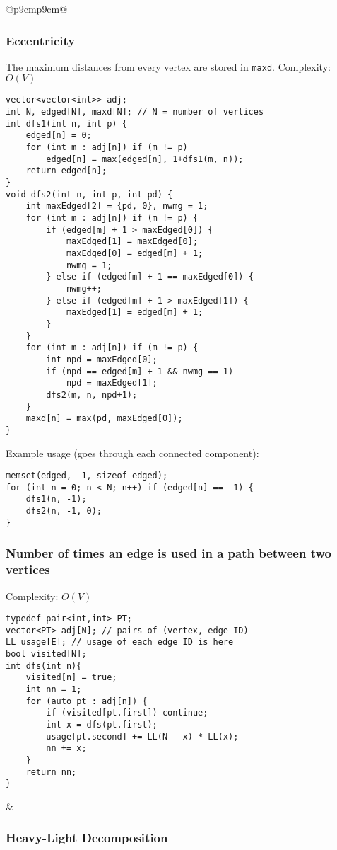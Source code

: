 \documentclass[letterpaper]{article}
\begin{document}
\clearpage
\begin{tabular}{@{}p{9cm}p{9cm}@{}}

\subsubsection{Eccentricity}

The maximum distances from every vertex are stored in \texttt{maxd}. Complexity: $O\left(V\right)$

\begin{lstlisting}
vector<vector<int>> adj;
int N, edged[N], maxd[N]; // N = number of vertices
int dfs1(int n, int p) {
	edged[n] = 0;
	for (int m : adj[n]) if (m != p)
		edged[n] = max(edged[n], 1+dfs1(m, n));
	return edged[n];
}
void dfs2(int n, int p, int pd) {
	int maxEdged[2] = {pd, 0}, nwmg = 1;
	for (int m : adj[n]) if (m != p) {
		if (edged[m] + 1 > maxEdged[0]) {
			maxEdged[1] = maxEdged[0];
			maxEdged[0] = edged[m] + 1;
			nwmg = 1;
		} else if (edged[m] + 1 == maxEdged[0]) {
			nwmg++;
		} else if (edged[m] + 1 > maxEdged[1]) {
			maxEdged[1] = edged[m] + 1;
		}
	}
	for (int m : adj[n]) if (m != p) {
		int npd = maxEdged[0];
		if (npd == edged[m] + 1 && nwmg == 1)
			npd = maxEdged[1];
		dfs2(m, n, npd+1);
	}
	maxd[n] = max(pd, maxEdged[0]);
}
\end{lstlisting}

Example usage (goes through each connected component):

\begin{lstlisting}
memset(edged, -1, sizeof edged);
for (int n = 0; n < N; n++) if (edged[n] == -1) {
	dfs1(n, -1);
	dfs2(n, -1, 0);
}
\end{lstlisting}

\subsubsection{Number of times an edge is used in a path between two vertices}

Complexity: $O\left(V\right)$

\begin{lstlisting}
typedef pair<int,int> PT;
vector<PT> adj[N]; // pairs of (vertex, edge ID)
LL usage[E]; // usage of each edge ID is here
bool visited[N];
int dfs(int n){ 
	visited[n] = true;
	int nn = 1;
	for (auto pt : adj[n]) {
		if (visited[pt.first]) continue;
		int x = dfs(pt.first);
		usage[pt.second] += LL(N - x) * LL(x);
		nn += x;
	}
	return nn;
}
\end{lstlisting}
&
\subsubsection{Heavy-Light Decomposition}


\end{tabular}
\end{document}
